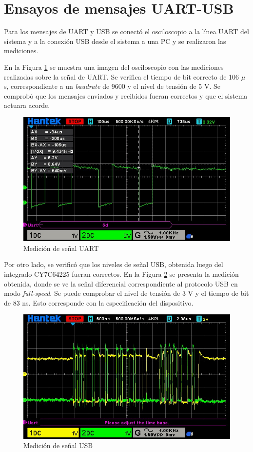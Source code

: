 \section{Ensayos de mensajes UART-USB}

Para los mensajes de UART y USB se conectó el osciloscopio a la línea UART del sistema y a la conexión USB desde el sistema a una PC y se realizaron las mediciones.

En la Figura \ref{fig:signal_uart} se muestra una imagen del osciloscopio con las mediciones realizadas sobre la señal de UART. Se verifica el tiempo de bit correcto de 106 $\mu$s, correspondiente a un \textit{baudrate} de 9600 y el nível de tensión de 5 V. Se comprobó que los mensajes enviados y recibidos fueran correctos y que el sistema actuara acorde.

\begin{figure}[htbp]
	\centering
	\includegraphics[scale=0.6]{./Figures/bit_time_uart.jpeg}
	\caption{Medición de señal UART}
	\label{fig:signal_uart}
\end{figure}

Por otro lado, se verificó que los niveles de señal USB, obtenida luego del integrado CY7C64225 fueran correctos. En la Figura \ref{fig:signal_usb} se presenta la medición obtenida, donde se ve la señal diferencial correspondiente al protocolo USB en modo \textit{full-speed}. Se puede comprobar el nivel de tensión de 3 V y el tiempo de bit de 83 ns. Esto corresponde con la especificación del dispositivo.

\begin{figure}[htbp]
	\centering
	\includegraphics[scale=0.6]{./Figures/msg_usb.jpeg}
	\caption{Medición de señal USB}
	\label{fig:signal_usb}
\end{figure}

